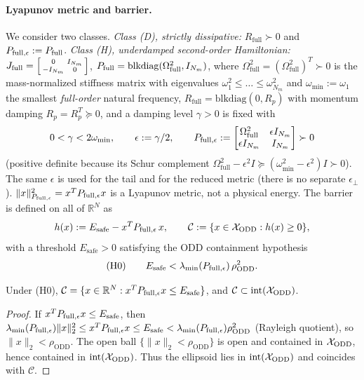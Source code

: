 \paragraph{Lyapunov metric and barrier.}
We consider two classes. \emph{Class (D), strictly dissipative:} \(R_{\mathrm{full}} \succ 0\) and \(P_{\mathrm{full},\epsilon} := P_{\mathrm{full}}\). \emph{Class (H), underdamped second-order Hamiltonian:} \(J_{\mathrm{full}} = \begin{bsmallmatrix} 0 & I_{N_m} \\ -I_{N_m} & 0 \end{bsmallmatrix}\), \(P_{\mathrm{full}} = \mathrm{blkdiag}(\Omega_{\mathrm{full}}^2, I_{N_m})\), where \(\Omega_{\mathrm{full}}^2 = (\Omega_{\mathrm{full}}^2)^T \succ 0\) is the mass-normalized stiffness matrix with eigenvalues \(\omega_1^2 \le \dots \le \omega_{N_m}^2\) and \(\omega_{\min} := \omega_1\) the smallest \emph{full-order} natural frequency, \(R_{\mathrm{full}} = \mathrm{blkdiag}(0, R_p)\) with momentum damping \(R_p = R_p^T \succeq 0\), and a damping level \(\gamma > 0\) is fixed with
\begin{equation}
\label{eq:eps_choice}
0 < \gamma < 2\omega_{\min}, \qquad \epsilon := \gamma/2, \qquad P_{\mathrm{full},\epsilon} := \begin{bmatrix} \Omega_{\mathrm{full}}^2 & \epsilon I_{N_m} \\ \epsilon I_{N_m} & I_{N_m} \end{bmatrix} \succ 0
\end{equation}
(positive definite because its Schur complement \(\Omega_{\mathrm{full}}^2 - \epsilon^2 I \succeq (\omega_{\min}^2 - \epsilon^2)I \succ 0\)). The same \(\epsilon\) is used for the tail and for the reduced metric (there is no separate \(\epsilon_\perp\)). \(\|x\|_{P_{\mathrm{full},\epsilon}}^2 = x^TP_{\mathrm{full},\epsilon} x\) is a Lyapunov metric, not a physical energy. The barrier is defined on all of \(\mathbb{R}^N\) as
\begin{equation}
\label{eq:h_def}
h(x) := E_{\mathrm{safe}} - x^T P_{\mathrm{full},\epsilon}\, x, \qquad \mathcal{C} := \{x \in \mathcal{X}_{\mathrm{ODD}} : h(x) \ge 0\},
\end{equation}
with a threshold \(E_{\mathrm{safe}} > 0\) satisfying the ODD containment hypothesis
\begin{equation}
\label{eq:H0}
\text{(H0)}\qquad E_{\mathrm{safe}} < \lambda_{\min}(P_{\mathrm{full},\epsilon})\,\rho_{\mathrm{ODD}}^2 .
\end{equation}

\begin{lemma}
\label{lem:odd_containment}
Under (H0), \(\mathcal{C} = \{x \in \mathbb{R}^N : x^TP_{\mathrm{full},\epsilon} x \le E_{\mathrm{safe}}\}\), and \(\mathcal{C} \subset \mathrm{int}(\mathcal{X}_{\mathrm{ODD}})\).
\end{lemma}
\begin{proof}
If \(x^TP_{\mathrm{full},\epsilon} x \le E_{\mathrm{safe}}\), then \(\lambda_{\min}(P_{\mathrm{full},\epsilon})\|x\|_2^2 \le x^TP_{\mathrm{full},\epsilon} x \le E_{\mathrm{safe}} < \lambda_{\min}(P_{\mathrm{full},\epsilon})\rho_{\mathrm{ODD}}^2\) (Rayleigh quotient), so \(\|x\|_2 < \rho_{\mathrm{ODD}}\). The open ball \(\{\|x\|_2 < \rho_{\mathrm{ODD}}\}\) is open and contained in \(\mathcal{X}_{\mathrm{ODD}}\), hence contained in \(\mathrm{int}(\mathcal{X}_{\mathrm{ODD}})\). Thus the ellipsoid lies in \(\mathrm{int}(\mathcal{X}_{\mathrm{ODD}})\) and coincides with \(\mathcal{C}\).
\end{proof}

